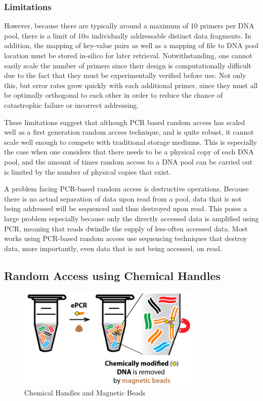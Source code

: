 \documentclass[a4paper,conference]{IEEEtran}
\begin{document}
\subsubsection{Limitations}
However, because there are typically around a maximum of 10 primers per DNA pool, there is a limit of $10n$ individually addressable distinct data fragments. In addition, the mapping of key-value pairs as well as a mapping of file to DNA pool location must be stored in-silico for later retrieval. Notwithstanding, one cannot easily scale the number of primers since their design is computationally difficult due to the fact that they must be experimentally verified before use. Not only this, but error rates grow quickly with each additional primer, since they must all be optimally orthogonal to each other in order to reduce the chance of catastrophic failure or incorrect addressing.

These limitations suggest that although PCR based random access has scaled well as a first generation random access technique, and is quite robust, it cannot scale well enough to compete with traditional storage mediums. This is especially the case when one considers that there needs to be a physical copy of each DNA pool, and the amount of times random access to a DNA pool can be carried out is limited by the number of physical copies that exist.

A problem facing PCR-based random access is destructive operations. Because there is no actual separation of data upon read from a pool, data that is not being addressed will be sequenced and thus destroyed upon read. This poses a large problem especially because only the directly accessed data is amplified using PCR, meaning that reads dwindle the supply of less-often accessed data. Most works using PCR-based random access use sequencing techniques that destroy data, more importantly, even data that is not being accessed, on read.

\subsection{Random Access using Chemical Handles}


\begin{figure}[!t]
\centering
\includegraphics[width=3.5in]{chemicalhandles}
\caption{Chemical Handles and Magnetic Beads}
\label{pcr_challenges}
\end{figure}
\end{document}
